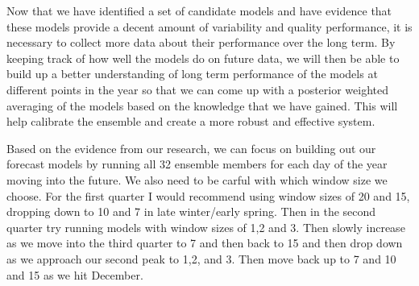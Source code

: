Now that we have identified a set of candidate models and have evidence that these models provide a decent amount of variability and quality performance, it is necessary to collect more data about their performance over the long term. By keeping track of how well the models do on future data, we will then be able to build up a better understanding of long term performance of the models at different points in the year so that we can come up with a posterior weighted averaging of the models based on the knowledge that we have gained. This will help calibrate the ensemble and create a more robust and effective system. \newline

\noindent Based on the evidence from our research, we can focus on building out our forecast models by running all 32 ensemble members for each day of the year moving into the future. We also need to be carful with which window size we choose. For the first quarter I would recommend using window sizes of 20 and 15, dropping down to 10 and 7 in late winter/early spring. Then in the second quarter try running models with window sizes of 1,2 and 3. Then slowly increase as we move into the third quarter to 7 and then back to 15 and then drop down as we approach our second peak to 1,2, and 3. Then move back up to 7 and 10 and 15 as we hit December. 


